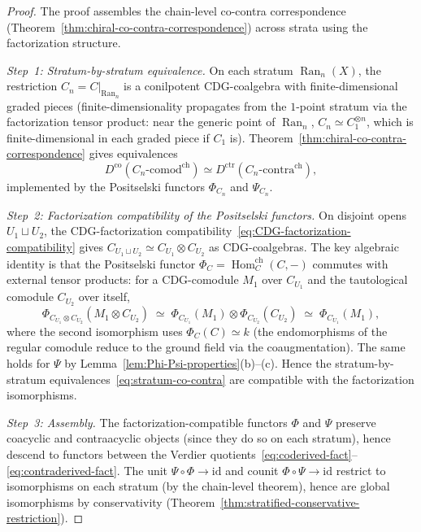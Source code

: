 \begin{proof}
The proof assembles the chain-level co-contra correspondence
(Theorem~\ref{thm:chiral-co-contra-correspondence}) across
strata using the factorization structure.

\emph{Step~1: Stratum-by-stratum equivalence.}
On each stratum $\operatorname{Ran}_n(X)$, the restriction
$C_n = C|_{\operatorname{Ran}_n}$ is a conilpotent CDG-coalgebra
with finite-dimensional graded pieces (finite-dimensionality
propagates from the $1$-point stratum via the factorization
tensor product: near the generic point of $\operatorname{Ran}_n$,
$C_n \simeq C_1^{\otimes n}$, which is finite-dimensional in each
graded piece if $C_1$ is).
Theorem~\ref{thm:chiral-co-contra-correspondence} gives
equivalences
\begin{equation}\label{eq:stratum-co-contra}
D^{\mathrm{co}}(C_n\text{-}\mathrm{comod}^{\mathrm{ch}})
\simeq
D^{\mathrm{ctr}}(C_n\text{-}\mathrm{contra}^{\mathrm{ch}}),
\end{equation}
implemented by the Positselski functors $\Phi_{C_n}$ and
$\Psi_{C_n}$.

\emph{Step~2: Factorization compatibility of the Positselski
functors.}
On disjoint opens $U_1 \sqcup U_2$, the CDG-factorization
compatibility~\eqref{eq:CDG-factorization-compatibility} gives
$C_{U_1 \sqcup U_2} \simeq C_{U_1} \otimes C_{U_2}$ as
CDG-coalgebras. The key algebraic identity is that the
Positselski functor
$\Phi_C = \operatorname{Hom}_C^{\mathrm{ch}}(C, -)$ commutes
with external tensor products: for a CDG-comodule
$M_1$ over $C_{U_1}$ and the tautological comodule $C_{U_2}$
over itself,
\[
\Phi_{C_{U_1} \otimes C_{U_2}}(M_1 \otimes C_{U_2})
\;\simeq\;
\Phi_{C_{U_1}}(M_1) \otimes \Phi_{C_{U_2}}(C_{U_2})
\;\simeq\;
\Phi_{C_{U_1}}(M_1),
\]
where the second isomorphism uses
$\Phi_C(C) \simeq k$ (the endomorphisms of the regular comodule
reduce to the ground field via the coaugmentation). The same
holds for $\Psi$ by
Lemma~\ref{lem:Phi-Psi-properties}(b)--(c). Hence the
stratum-by-stratum equivalences~\eqref{eq:stratum-co-contra} are
compatible with the factorization isomorphisms.

\emph{Step~3: Assembly.}
The factorization-compatible functors $\Phi$ and $\Psi$ preserve
coacyclic and contraacyclic objects (since they do so on each
stratum), hence descend to functors between the Verdier
quotients~\eqref{eq:coderived-fact}--\eqref{eq:contraderived-fact}.
The unit $\Psi \circ \Phi \to \mathrm{id}$ and counit
$\Phi \circ \Psi \to \mathrm{id}$ restrict to isomorphisms on
each stratum (by the chain-level theorem), hence are global
isomorphisms by conservativity
(Theorem~\ref{thm:stratified-conservative-restriction}).
\end{proof}


